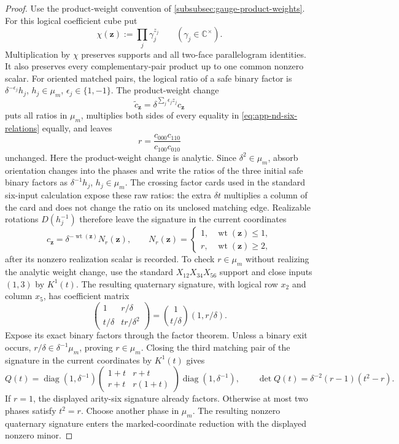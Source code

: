 \documentclass[11pt,letterpaper,onecolumn]{article}
\theoremstyle{plain}
\theoremstyle{definition}
\theoremstyle{remark}
\newcommand{\diag}{\operatorname{diag}}
\newcommand{\wt}{\operatorname{wt}}
\begin{document}
\begin{proof}
Use the product-weight convention of
\cref{subsubsec:gauge-product-weights}. For this logical
coefficient cube put
\[
 \chi({\mathbf z}):=\prod_j\gamma_j^{z_j}\qquad(\gamma_j\in\mathbb C^\times).
\]
Multiplication by \(\chi\) preserves supports and all two-face
parallelogram identities.  It also preserves every complementary-pair
product up to one common nonzero scalar.  For oriented matched pairs, the logical ratio of a safe binary factor is
\(\delta^{-\epsilon_j}h_j\), \(h_j\in \mu_m\),
\(\epsilon_j\in\{1,-1\}\).  The product-weight change
\[
  \widetilde c_{\mathbf z}
  =\delta^{\sum_j\epsilon_jz_j}c_{\mathbf z}
\]
puts all ratios in \(\mu_m\), multiplies both sides of every equality in
\cref{eq:app-nd-six-relations} equally, and leaves
\[
  r=\frac{c_{000}c_{110}}{c_{100}c_{010}}
\]
unchanged.  Here the product-weight change is analytic.  Since
\(\delta^2\in \mu_m\), absorb orientation changes into the phases and write
the ratios of the three initial safe binary factors as \(\delta^{-1}h_j\), \(h_j\in \mu_m\).
The crossing factor cards used in the standard six-input calculation
expose these raw ratios: the extra \(\delta t\) multiplies a column of
the card and does not change the ratio on its unclosed matching edge.
Realizable rotations \(D(h_j^{-1})\) therefore leave the signature in the current coordinates
\[
 c_{\mathbf z}=\delta^{-\wt({\mathbf z})}N_r({\mathbf z}),
 \qquad N_r({\mathbf z})=\begin{cases}1,&\wt({\mathbf z})\le1,\\r,&\wt({\mathbf z})\ge2,\end{cases}
\]
after its nonzero realization scalar is recorded.  To check \(r\in \mu_m\)
without realizing the analytic weight change, use the standard
\(X_{12}X_{34}X_{56}\) support and close inputs \((1,3)\) by \(K^1(t)\).
The resulting quaternary signature, with logical row \(x_2\) and column
\(x_5\), has coefficient matrix
\[
 \begin{pmatrix}1&r/\delta\\t/\delta&tr/\delta^2\end{pmatrix}
 =\binom{1}{t/\delta}(1,r/\delta).
\]
Expose its exact binary factors through the factor theorem.  Unless a
binary exit occurs, \(r/\delta\in\delta^{-1}\mu_m\), proving \(r\in \mu_m\).
Closing the third matching pair of the signature in the current coordinates by \(K^1(t)\) gives
\[
 Q(t)=\diag(1,\delta^{-1})
 \begin{pmatrix}1+t&r+t\\r+t&r(1+t)\end{pmatrix}
 \diag(1,\delta^{-1}),\qquad
 \det Q(t)=\delta^{-2}(r-1)(t^2-r).
\]
If \(r=1\), the displayed arity-six signature already factors.  Otherwise
at most two phases satisfy \(t^2=r\). Choose another phase in \(\mu_m\).
The resulting nonzero quaternary signature enters the marked-coordinate
reduction with the displayed nonzero minor.


\end{proof}
\end{document}

